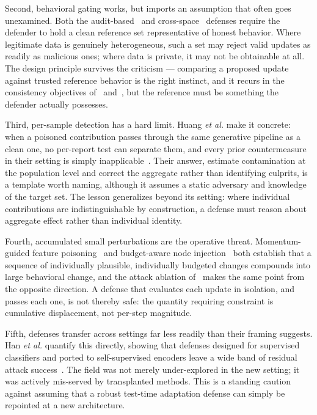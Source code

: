 \documentclass[journal]{IEEEtran}
\begin{document}
Second, behavioral gating works, but imports an assumption that often goes
unexamined. Both the audit-based~\cite{basak2025dpad} and
cross-space~\cite{nawshin2026concurrent} defenses require the defender to hold a
clean reference set representative of honest behavior. Where legitimate data is
genuinely heterogeneous, such a set may reject valid updates as readily as malicious
ones; where data is private, it may not be obtainable at all. The design principle
survives the criticism --- comparing a proposed update against trusted reference
behavior is the right instinct, and it recurs in the consistency objectives
of~\cite{li2024ast} and~\cite{zhang2025cola}, but the reference must be something
the defender actually possesses.

Third, per-sample detection has a hard limit. Huang \emph{et al.} make it concrete:
when a poisoned contribution passes through the same generative pipeline as a clean
one, no per-report test can separate them, and every prior countermeasure in their
setting is simply inapplicable~\cite{huang2024ldpguard}. Their answer, estimate
contamination at the population level and correct the aggregate rather than
identifying culprits, is a template worth naming, although it assumes a static
adversary and knowledge of the target set. The lesson generalizes beyond its
setting: where individual contributions are indistinguishable by construction, a
defense must reason about aggregate effect rather than individual identity.

Fourth, accumulated small perturbations are the operative threat. Momentum-guided
feature poisoning~\cite{chen2025mghga} and budget-aware node
injection~\cite{shi2025h3ni} both establish that a sequence of individually
plausible, individually budgeted changes compounds into large behavioral change, and
the attack ablation of~\cite{wang2026insulator} makes the same point from the
opposite direction. A defense that evaluates each update in isolation, and passes
each one, is not thereby safe: the quantity requiring constraint is cumulative
displacement, not per-step magnitude.

Fifth, defenses transfer across settings far less readily than their framing
suggests. Han \emph{et al.} quantify this directly, showing that defenses designed
for supervised classifiers and ported to self-supervised encoders leave a wide band
of residual attack success~\cite{han2025mimic}. The field was not merely
under-explored in the new setting; it was actively mis-served by transplanted
methods. This is a standing caution against assuming that a robust test-time
adaptation defense can simply be repointed at a new architecture.
\end{document}
